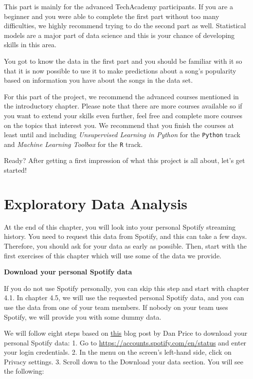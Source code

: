 \documentclass[
  11pt,
]{book}
\begin{document}
This part is mainly for the advanced TechAcademy participants. If you are a beginner and you were able to complete the first part without too many difficulties, we highly recommend trying to do the second part as well. Statistical models are a major part of data science and this is your chance of developing skills in this area.

You got to know the data in the first part and you should be familiar with it so that it is now possible to use it to make predictions about a song's popularity based on information you have about the songs in the data set.

For this part of the project, we recommend the advanced courses mentioned in the introductory chapter. Please note that there are more courses available so if you want to extend your skills even further, feel free and complete more courses on the topics that interest you. We recommend that you finish the courses at least until and including \emph{Unsupervised Learning in Python} for the \texttt{Python} track and \emph{Machine Learning Toolbox} for the \texttt{R} track.

Ready? After getting a first impression of what this project is all about, let's get started!

\newpage

\hypertarget{exploratory-data-analysis}{%
\chapter{Exploratory Data Analysis}\label{exploratory-data-analysis}}

At the end of this chapter, you will look into your personal Spotify streaming history. You need to request this data from Spotify, and this can take a few days. Therefore, you should ask for your data as early as possible. Then, start with the first exercises of this chapter which will use some of the data we provide.

\textbf{Download your personal Spotify data}

If you do not use Spotify personally, you can skip this step and start with chapter 4.1.
In chapter 4.5, we will use the requested personal Spotify data, and you can use the data from one of your team members. If nobody on your team uses Spotify, we will provide you with some dummy data.

We will follow eight steps based on \href{https://www.makeuseof.com/tag/download-privacy-data-spotify/}{this} blog post by Dan Price to download your personal Spotify data:
1. Go to \url{https://accounts.spotify.com/en/status} and enter your login credentials.
2. In the menu on the screen's left-hand side, click on Privacy settings.
3. Scroll down to the Download your data section. You will see the following:
\end{document}
